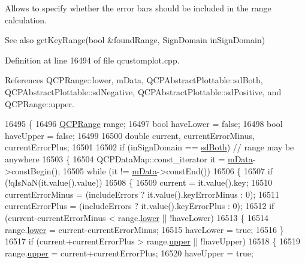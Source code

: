 Allows to specify whether the error bars should be included in the range calculation.

\begin{DoxySeeAlso}{See also}
get\+Key\+Range(bool \&found\+Range, Sign\+Domain in\+Sign\+Domain) 
\end{DoxySeeAlso}


Definition at line 16494 of file qcustomplot.\+cpp.



References Q\+C\+P\+Range\+::lower, m\+Data, Q\+C\+P\+Abstract\+Plottable\+::sd\+Both, Q\+C\+P\+Abstract\+Plottable\+::sd\+Negative, Q\+C\+P\+Abstract\+Plottable\+::sd\+Positive, and Q\+C\+P\+Range\+::upper.


\begin{DoxyCode}
16495 \{
16496   \hyperlink{class_q_c_p_range}{QCPRange} range;
16497   \textcolor{keywordtype}{bool} haveLower = \textcolor{keyword}{false};
16498   \textcolor{keywordtype}{bool} haveUpper = \textcolor{keyword}{false};
16499   
16500   \textcolor{keywordtype}{double} current, currentErrorMinus, currentErrorPlus;
16501   
16502   \textcolor{keywordflow}{if} (inSignDomain == \hyperlink{class_q_c_p_abstract_plottable_a661743478a1d3c09d28ec2711d7653d8a082b98cfb91a7363a3b5cd17b0c1cd60}{sdBoth}) \textcolor{comment}{// range may be anywhere}
16503   \{
16504     QCPDataMap::const\_iterator it = \hyperlink{class_q_c_p_graph_a8457c840f69a0ac49f61d30a509c5d08}{mData}->constBegin();
16505     \textcolor{keywordflow}{while} (it != \hyperlink{class_q_c_p_graph_a8457c840f69a0ac49f61d30a509c5d08}{mData}->constEnd())
16506     \{
16507       \textcolor{keywordflow}{if} (!qIsNaN(it.value().value))
16508       \{
16509         current = it.value().key;
16510         currentErrorMinus = (includeErrors ? it.value().keyErrorMinus : 0);
16511         currentErrorPlus = (includeErrors ? it.value().keyErrorPlus : 0);
16512         \textcolor{keywordflow}{if} (current-currentErrorMinus < range.\hyperlink{class_q_c_p_range_aa3aca3edb14f7ca0c85d912647b91745}{lower} || !haveLower)
16513         \{
16514           range.\hyperlink{class_q_c_p_range_aa3aca3edb14f7ca0c85d912647b91745}{lower} = current-currentErrorMinus;
16515           haveLower = \textcolor{keyword}{true};
16516         \}
16517         \textcolor{keywordflow}{if} (current+currentErrorPlus > range.\hyperlink{class_q_c_p_range_ae44eb3aafe1d0e2ed34b499b6d2e074f}{upper} || !haveUpper)
16518         \{
16519           range.\hyperlink{class_q_c_p_range_ae44eb3aafe1d0e2ed34b499b6d2e074f}{upper} = current+currentErrorPlus;
16520           haveUpper = \textcolor{keyword}{true};

\end{DoxyCode}
